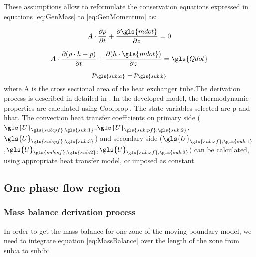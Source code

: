 \documentclass[11pt]{article} %
\begin{document}
These assumptions allow to reformulate the conservation equations expressed in equations \ref{eq:GenMass} to \ref{eq:GenMomentum} as:

\begin{equation}
A \cdot \frac{\partial \rho}{\partial t} + \frac{\partial \gls{mdot}}{\partial z}= 0
\label{eq:MassBalance}
\end{equation}

\begin{equation}
A \cdot \frac{\partial(\rho \cdot h - p)}{\partial t} + \frac{\partial ( h \cdot \gls{mdot})}{\partial z} = \gls{Qdot}
\label{eq:EnergyBalance}
\end{equation}

\begin{equation}
p_{\gls{sub:a}} = p_{\gls{sub:b}}
\label{eq:MomentumBalance}
\end{equation}
where A is the cross sectional area of the heat exchanger tube.The derivation process is described in detailed in \cite{KevinDocument}.
In the developed model, the thermodynamic properties are calculated using Coolprop \cite{Bell2013}. The state variables selected are \gls{p} and \gls{hbar}. The convection heat transfer coefficients  on primary side ($\gls{U}_{\gls{sub:pf},\gls{sub:1}}$,$\gls{U}_{\gls{sub:pf},\gls{sub:2}}$,$\gls{U}_{\gls{sub:pf},\gls{sub:3}}$) and secondary side ($\gls{U}_{\gls{sub:sf},\gls{sub:1}}$,$\gls{U}_{\gls{sub:sf},\gls{sub:2}}$,$\gls{U}_{\gls{sub:sf},\gls{sub:3}}$) can be calculated, using appropriate heat transfer model, or imposed as constant\\

\subsection{One phase flow region}
\label{sec: OnePhase}


\subsubsection{Mass balance derivation process}
In order to get the mass balance for one zone of the moving boundary model, we need to integrate equation \ref{eq:MassBalance} over the length of the zone from \gls{sub:a} to {\gls{sub:b}}:
\end{document}
